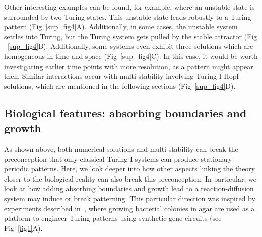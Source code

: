 \documentclass[10pt,letterpaper]{article}
\begin{document}
Other interesting examples can be found, for example, where an unstable state is surrounded by two Turing states. This unstable state leads robustly to a Turing pattern (Fig~\ref{sup_fig4}A).
Additionally, in some cases, the unstable system settles into Turing, but the Turing system gets pulled by the stable attractor (Fig ~\ref{sup_fig4}B). Additionally, some systems even exhibit three solutions which are homogeneous in time and space (Fig~\ref{sup_fig4}C). In this case, it would be worth investigating earlier time points with more resolution, as a pattern might appear then.
Similar interactions occur with multi-stability involving Turing I-Hopf solutions, which are mentioned in the following sections (Fig~\ref{sup_fig4}D).




\subsection*{Biological features: absorbing boundaries and growth}
As shown above, both numerical solutions and multi-stability can break the preconception that only classical Turing I systems can produce stationary periodic patterns.
Here, we look deeper into how other aspects linking the theory closer to the biological reality can also break this preconception.
In particular, we look at how adding absorbing boundaries and growth lead to a reaction-diffusion system may induce or break patterning.
This particular direction was inspired by experiments described in~\parencite{Oliver2023}, where growing bacterial colonies in agar are used as a platform to engineer Turing patterns using synthetic gene circuits (see Fig~\ref{fig1}A).
\end{document}
